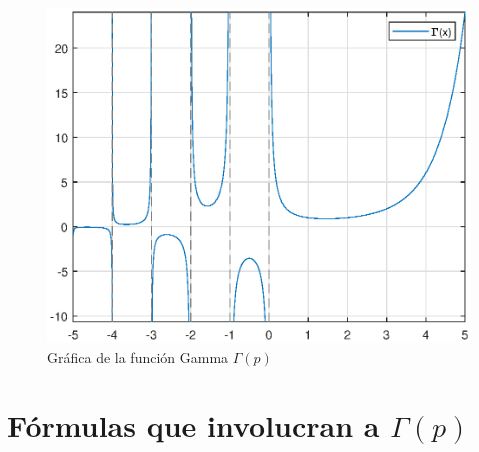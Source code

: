 \begin{figure}[H]
   \centering
   \includegraphics[scale=0.75]{Imagenes/Plot_Gamma.eps}
   \caption{Gráfica de la función Gamma $\Gamma (p)$}
   \label{fig:figura_plot_gamma}
\end{figure}
\section{Fórmulas que involucran a $\Gamma (p)$}
